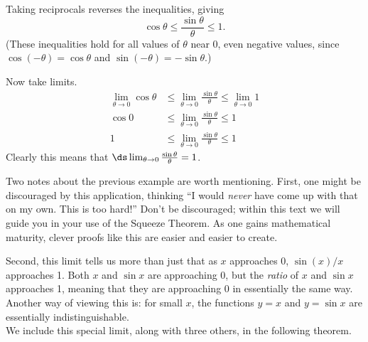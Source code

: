{Taking reciprocals reverses the inequalities, giving
\[\cos\theta\leq\frac{\sin\theta}{\theta}\leq 1.\]
(These inequalities hold for all values of $\theta$ near 0, even negative values, since $\cos(-\theta)=\cos\theta$ and $\sin(-\theta)=-\sin\theta$.)

Now take limits.
\begin{align*}
\lim_{\theta\to 0} \cos \theta &\leq \lim_{\theta\to 0} \frac{\sin\theta}{\theta} \leq \lim_{\theta\to 0}  1 \\
\cos 0 & \leq \lim_{\theta\to 0} \frac{\sin\theta}{\theta} \leq  1 \\
1 & \leq \lim_{\theta\to 0} \frac{\sin\theta}{\theta} \leq  1
\end{align*}
Clearly this means that $\ds \lim_{\theta\to 0} \frac{\sin\theta}{\theta}=1$.}

Two notes about the previous example are worth mentioning. First, one might be discouraged by this application, thinking ``I would \textit{never} have come up with that on my own. This is too hard!'' Don't be discouraged; within this text we will guide you in your use of the Squeeze Theorem. As one gains mathematical maturity, clever proofs like this are easier and easier to create.

Second, this limit tells us more than just that as $x$ approaches 0, $\sin(x)/x$ approaches 1. Both $x$ and $\sin x$ are approaching 0, but the \textit{ratio} of $x$ and $\sin x$ approaches 1, meaning that they are approaching 0 in essentially the same way. Another way of viewing this is: for small $x$, the functions $y=x$ and $y=\sin x$ are essentially indistinguishable.\\

We include this special limit, along with three others, in the following theorem.


